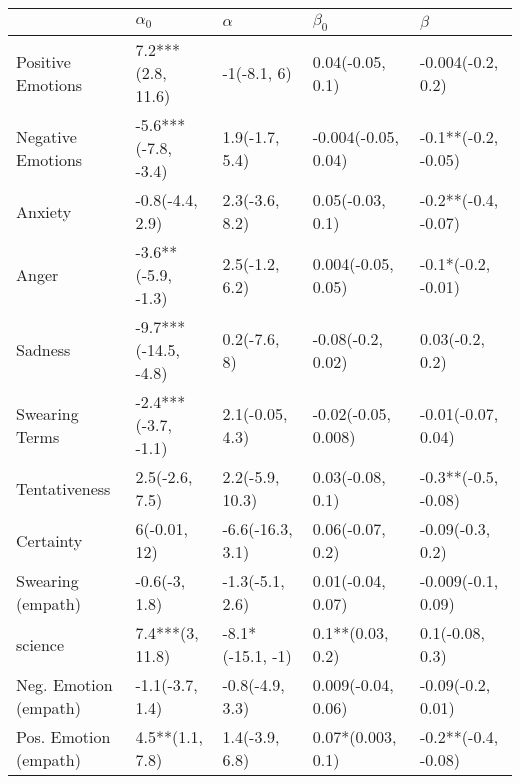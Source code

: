 \begin{tabular}{lllll}
\toprule
{} &            $\alpha_0$ &          $\alpha$ &            $\beta_0$ &              $\beta$ \\
\midrule
Positive Emotions     &     7.2***(2.8, 11.6) &       -1(-8.1, 6) &     0.04(-0.05, 0.1) &    -0.004(-0.2, 0.2) \\
Negative Emotions     &   -5.6***(-7.8, -3.4) &    1.9(-1.7, 5.4) &  -0.004(-0.05, 0.04) &  -0.1**(-0.2, -0.05) \\
Anxiety               &       -0.8(-4.4, 2.9) &    2.3(-3.6, 8.2) &     0.05(-0.03, 0.1) &  -0.2**(-0.4, -0.07) \\
Anger                 &    -3.6**(-5.9, -1.3) &    2.5(-1.2, 6.2) &   0.004(-0.05, 0.05) &   -0.1*(-0.2, -0.01) \\
Sadness               &  -9.7***(-14.5, -4.8) &      0.2(-7.6, 8) &    -0.08(-0.2, 0.02) &      0.03(-0.2, 0.2) \\
Swearing Terms        &   -2.4***(-3.7, -1.1) &   2.1(-0.05, 4.3) &  -0.02(-0.05, 0.008) &   -0.01(-0.07, 0.04) \\
Tentativeness         &        2.5(-2.6, 7.5) &   2.2(-5.9, 10.3) &     0.03(-0.08, 0.1) &  -0.3**(-0.5, -0.08) \\
Certainty             &          6(-0.01, 12) &  -6.6(-16.3, 3.1) &     0.06(-0.07, 0.2) &     -0.09(-0.3, 0.2) \\
Swearing (empath)     &         -0.6(-3, 1.8) &   -1.3(-5.1, 2.6) &    0.01(-0.04, 0.07) &   -0.009(-0.1, 0.09) \\
science               &       7.4***(3, 11.8) &  -8.1*(-15.1, -1) &     0.1**(0.03, 0.2) &      0.1(-0.08, 0.3) \\
Neg. Emotion (empath) &       -1.1(-3.7, 1.4) &   -0.8(-4.9, 3.3) &   0.009(-0.04, 0.06) &    -0.09(-0.2, 0.01) \\
Pos. Emotion (empath) &       4.5**(1.1, 7.8) &    1.4(-3.9, 6.8) &    0.07*(0.003, 0.1) &  -0.2**(-0.4, -0.08) \\
\bottomrule
\end{tabular}
